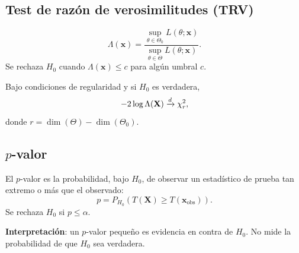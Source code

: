 \subsection{Test de razón de verosimilitudes (TRV)}

\begin{defi}
  \[
    \Lambda(\mathbf{x}) =
    \frac{\sup_{\theta \in \Theta_0} L(\theta;\mathbf{x})}
         {\sup_{\theta \in \Theta} L(\theta;\mathbf{x})}.
  \]
  Se rechaza $H_0$ cuando $\Lambda(\mathbf{x}) \leq c$ para algún umbral $c$.
\end{defi}

\begin{teo}[Wilks]
  Bajo condiciones de regularidad y si $H_0$ es verdadera,
  \[
    -2\log\Lambda(\mathbf{X}) \xrightarrow{d} \chi^2_r,
  \]
  donde $r = \dim(\Theta) - \dim(\Theta_0)$.
\end{teo}

\subsection{$p$-valor}

\begin{defi}[$p$-valor]
  El $p$-valor es la probabilidad, bajo $H_0$, de observar un estadístico de
  prueba tan extremo o más que el observado:
  \[
    p = P_{H_0}(T(\mathbf{X}) \geq T(\mathbf{x}_{\text{obs}})).
  \]
  Se rechaza $H_0$ si $p \leq \alpha$.
\end{defi}

\begin{resultado}
  \textbf{Interpretación}: un $p$-valor pequeño es evidencia en contra de
  $H_0$. No mide la probabilidad de que $H_0$ sea verdadera.
\end{resultado}
